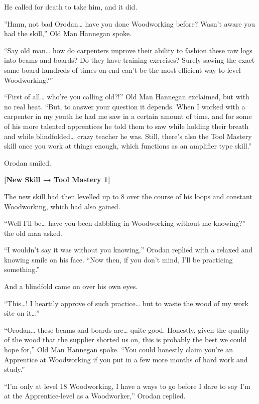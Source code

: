 \documentclass[a4paper,10pt]{book}
\begin{document}
He called for death to take him, and it did.\par
\par
”Hmm, not bad Orodan… have you done Woodworking before? Wasn’t aware you had the skill,” Old Man Hannegan spoke.\par
“Say old man… how do carpenters improve their ability to fashion these raw logs into beams and boards? Do they have training exercises? Surely sawing the exact same board hundreds of times on end can’t be the most efficient way to level Woodworking?”\par
“First of all… who’re you calling old?!” Old Man Hannegan exclaimed, but with no real heat. “But, to answer your question it depends. When I worked with a carpenter in my youth he had me saw in a certain amount of time, and for some of his more talented apprentices he told them to saw while holding their breath and while blindfolded… crazy teacher he was. Still, there’s also the Tool Mastery skill once you work at things enough, which functions as an amplifier type skill.”\par
Orodan smiled.\par
\par
\textbf{[New Skill → Tool Mastery 1]}\par
The new skill had then levelled up to 8 over the course of his loops and constant Woodworking, which had also gained.\par
“Well I’ll be… have you been dabbling in Woodworking without me knowing?” the old man asked.\par
“I wouldn’t say it was without you knowing,” Orodan replied with a relaxed and knowing smile on his face. “Now then, if you don’t mind, I’ll be practicing something.”\par
And a blindfold came on over his own eyes.\par
“This…! I heartily approve of such practice… but to waste the wood of my work site on it…”\par
\par
“Orodan… these beams and boards are… quite good. Honestly, given the quality of the wood that the supplier shorted us on, this is probably the best we could hope for,” Old Man Hannegan spoke. “You could honestly claim you’re an Apprentice at Woodworking if you put in a few more months of hard work and study.”\par
“I’m only at level 18 Woodworking, I have a ways to go before I dare to say I’m at the Apprentice-level as a Woodworker,” Orodan replied.\par
\end{document}
